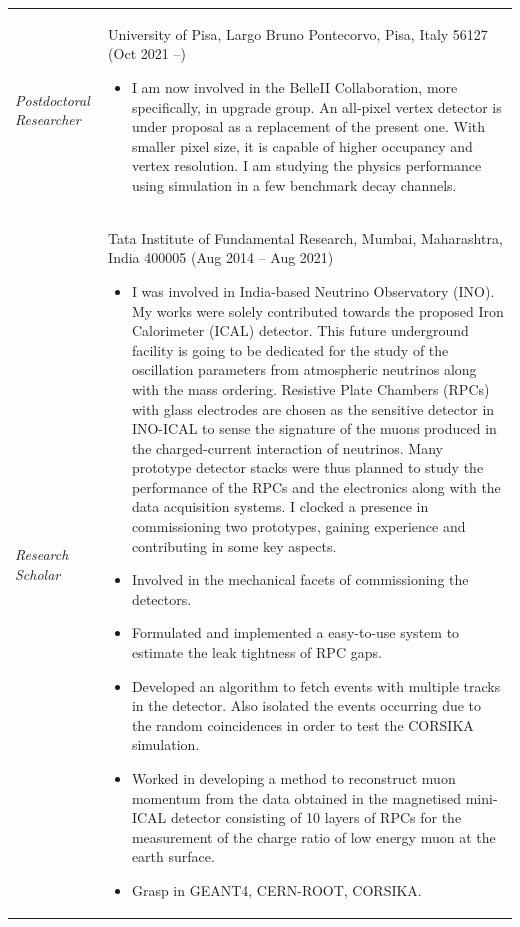 \documentclass[12pt]{article}
\begin{document}
\begin{minipage}{1.05\textwidth}
\vspace{0.4cm}
\begin{tabular}{p{3cm} p{14cm} }
  {\emph{Postdoctoral Researcher}} & University of Pisa, Largo Bruno Pontecorvo, Pisa, Italy 56127 (Oct 2021 --)

  \begin{itemize}
  \item\mbox{} I am now involved in the BelleII Collaboration, more
    specifically, in upgrade group.
    An all-pixel vertex detector is under proposal as a replacement of
    the present one. With smaller pixel size, it is capable of higher
    occupancy and vertex resolution.
    I am studying the physics performance using simulation in a
    few benchmark decay channels.
  \end{itemize}
  \\

  {\emph{Research Scholar}} & Tata Institute of Fundamental Research, Mumbai, Maharashtra, India 400005 (Aug 2014 -- Aug 2021)

  \begin{itemize}
  \item I was involved in India-based Neutrino
    Observatory (INO). My works were solely contributed towards
    the proposed Iron Calorimeter (ICAL) detector. This future
    underground facility is going to be dedicated for the study of the
    oscillation parameters from atmospheric neutrinos along with
    the mass ordering. Resistive Plate Chambers (RPCs) with glass
    electrodes are chosen as the sensitive detector in INO-ICAL to
    sense the signature of the muons produced in the charged-current
    interaction of neutrinos. Many prototype detector stacks were thus
    planned to study the performance of the RPCs and the electronics
    along with the data acquisition systems. I clocked a presence
    in commissioning two prototypes, gaining experience and contributing
    in some key aspects.
  \item Involved in the mechanical facets of commissioning the detectors.
  \item Formulated and implemented a easy-to-use system to estimate the
    leak tightness of RPC gaps.
  \item Developed an algorithm to fetch events with multiple tracks
    in the detector. Also isolated the events occurring due to the
    random coincidences in order to test the CORSIKA simulation.
  \item Worked in developing a method to reconstruct muon momentum
    from the data obtained in the magnetised mini-ICAL detector
    consisting of 10 layers of RPCs for the measurement of the charge
    ratio of low energy muon at the earth surface.
  \item Grasp in GEANT4, CERN-ROOT, CORSIKA.
  \end{itemize}

\end{tabular}
\end{minipage}
\end{document}
